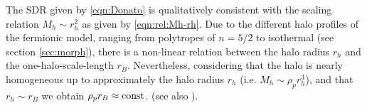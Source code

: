 The SDR given by \cref{eqn:Donato} is qualitatively consistent with the scaling relation $M_h \sim r_h^2$ as given by \cref{eqn:rel:Mh-rh}. Due to the different halo profiles of the fermionic model, ranging from polytropes of $n=5/2$ to isothermal (see section \ref{sec:morph}), there is a non-linear relation between the halo radius $r_h$ and the one-halo-scale-length $r_B$. Nevertheless, considering that the halo is nearly homogeneous up to approximately the halo radius $r_h$ (i.e. $M_h \sim \rho_p r_h^3$), and that $r_h \sim r_B$ we obtain $\rho_p r_B \approx \mathrm{const}$. (see also \citealp{2019PDU....24..278A}).
